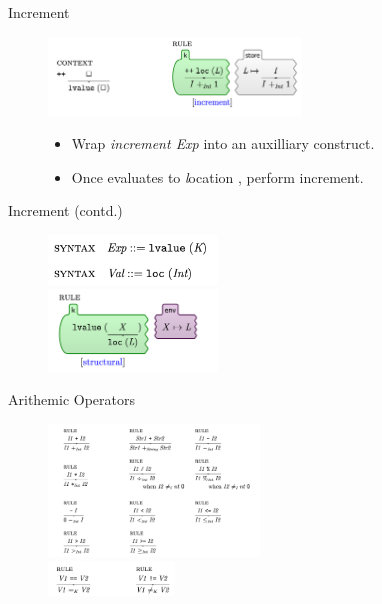 \documentclass{beamer}
\begin{document}
\begin{frame}{Increment}
\begin{figure}[h]
    \includegraphics[width=0.6\textwidth]{increment}

    \pause
    \begin{itemize}
        \item Wrap \textit{increment Exp} into an auxilliary  construct.
        \item Once  evaluates to \textit location ,
              perform increment.
    \end{itemize}
\end{figure}

\end{frame}

\begin{frame}{Increment (contd.)}
    \begin{figure}
        \centering
    \includegraphics[width=0.4\textwidth]{lvalue-decl}
    \\
    \includegraphics[width=0.4\textwidth]{lvalue-rules}
    \end{figure}
\end{frame}

\begin{frame}{Arithemic Operators}
    \begin{figure}
        \centering
    \includegraphics[width=0.5\textwidth]{arith-1}
    \\
    \includegraphics[width=0.3\textwidth]{arith-2}
    \end{figure}
\end{frame}
\end{document}
